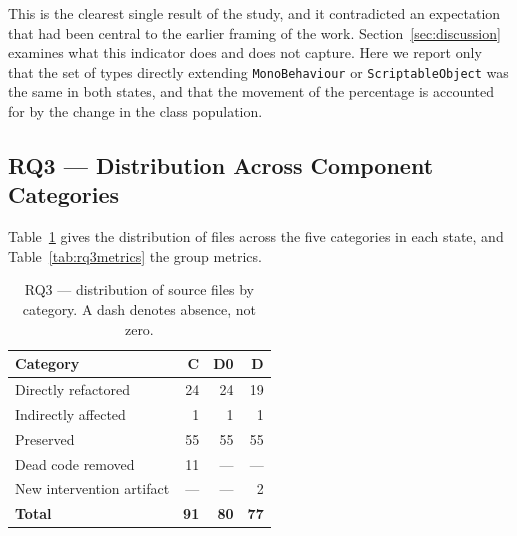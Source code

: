 \documentclass{sbc2019}%
\begin{document}
This is the clearest single result of the study, and it contradicted an
expectation that had been central to the earlier framing of the work.
Section~\ref{sec:discussion} examines what this indicator does and does not
capture. Here we report only that the set of types directly extending
\texttt{MonoBehaviour} or \texttt{ScriptableObject} was the same in both states,
and that the movement of the percentage is accounted for by the change in the
class population.

\subsection{RQ3 --- Distribution Across Component Categories}\label{sec:rq3}

Table~\ref{tab:rq3dist} gives the distribution of files across the five
categories in each state, and Table~\ref{tab:rq3metrics} the group metrics.

\begin{table}[!htbp]
\centering
\caption{RQ3 --- distribution of source files by category. A dash denotes
absence, not zero.}\label{tab:rq3dist}
\small
\begin{tabular}{lrrr}
\toprule
\textbf{Category} & \textbf{C} & \textbf{D0} & \textbf{D} \\
\midrule
Directly refactored        & 24 & 24 & 19 \\
Indirectly affected        & 1  & 1  & 1 \\
Preserved                  & 55 & 55 & 55 \\
Dead code removed          & 11 & ---& --- \\
New intervention artifact  & ---& ---& 2 \\
\midrule
\textbf{Total}             & \textbf{91} & \textbf{80} & \textbf{77} \\
\bottomrule
\end{tabular}
\end{table}
\end{document}
